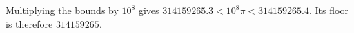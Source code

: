 Multiplying the bounds by $10^8$ gives $314159265.3<10^8\pi<314159265.4$. Its floor is therefore $\boxed{314159265}$.
